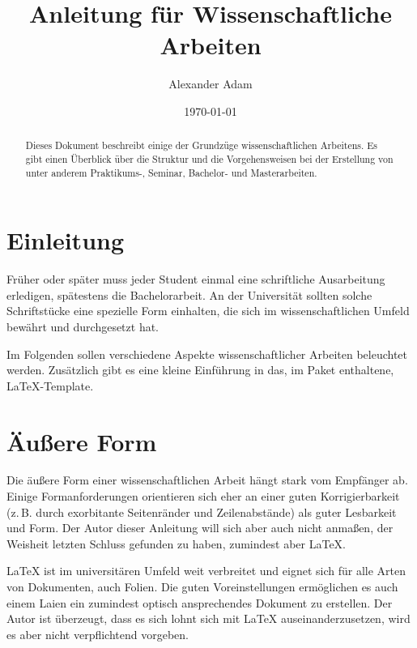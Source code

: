 \documentclass[a4paper, 11pt]{article}
\title{Anleitung für Wissenschaftliche Arbeiten}
\author{Alexander Adam}
\date{\today}
\begin{document}
\maketitle

\begin{abstract}
Dieses Dokument beschreibt einige der Grundzüge wissenschaftlichen Arbeitens. Es gibt einen Überblick über die Struktur und die Vorgehensweisen bei der Erstellung von unter anderem Praktikums-, Seminar, Bachelor- und Masterarbeiten.
\end{abstract}

\tableofcontents

\section{Einleitung}

Früher oder später muss jeder Student einmal eine schriftliche Ausarbeitung erledigen, spätestens die Bachelorarbeit. An der Universität sollten solche Schriftstücke eine spezielle Form einhalten, die sich im wissenschaftlichen Umfeld bewährt und durchgesetzt hat.

Im Folgenden sollen verschiedene Aspekte wissenschaftlicher Arbeiten beleuchtet werden. Zusätzlich gibt es eine kleine Einführung in das, im Paket enthaltene, \LaTeX-Template.

\section{Äußere Form}

Die äußere Form einer wissenschaftlichen Arbeit hängt stark vom Empfänger ab. Einige Formanforderungen orientieren sich eher an einer guten Korrigierbarkeit (z.\,B. durch exorbitante Seitenränder und Zeilenabstände) als guter Lesbarkeit und Form. Der Autor dieser Anleitung will sich aber auch nicht anmaßen, der Weisheit letzten Schluss gefunden zu haben, zumindest aber \LaTeX.

\LaTeX{} ist im universitären Umfeld weit verbreitet und eignet sich für alle Arten von Dokumenten, auch Folien. Die guten Voreinstellungen ermöglichen es auch einem Laien ein zumindest optisch ansprechendes Dokument zu erstellen. Der Autor ist überzeugt, dass es sich lohnt sich mit \LaTeX{} auseinanderzusetzen, wird es aber nicht verpflichtend vorgeben.
\end{document}
